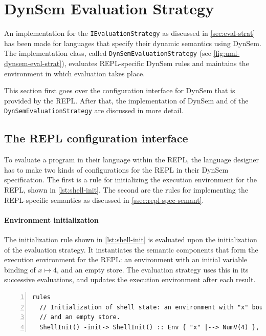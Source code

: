 \section{DynSem Evaluation Strategy}
\label{sec:dynsem-eval-strat}
An implementation for the \texttt{IEvaluationStrategy} as discussed in
\cref{sec:eval-strat} has been made for languages that specify their dynamic
semantics using DynSem. The implementation class, called
\texttt{DynSemEvaluationStrategy} (see \cref{fig:uml-dynsem-eval-strat}),
evaluates REPL-specific DynSem rules and maintains the environment in which
evaluation takes place.

This section first goes over the configuration interface for DynSem that is
provided by the REPL. After that, the implementation of DynSem and of the
\texttt{DynSemEvaluationStrategy} are discussed in more detail.

\subsection{The REPL configuration interface}
\label{sec:impl-repl-spec}
To evaluate a program in their language within the REPL, the language designer
has to make two kinds of configurations for the REPL in their DynSem
specification. The first is a rule for initializing the execution environment
for the REPL, shown in \cref{lst:shell-init}. The second are the rules for
implementing the REPL-specific semantics as discussed in
\cref{ssec:repl-spec-semant}.

\paragraph{Environment initialization} The initialization rule shown in
\cref{lst:shell-init} is evaluated upon the initialization of the evaluation
strategy. It instantiates the semantic components that form the execution
environment for the REPL: an environment with an initial variable binding of
$x \mapsto 4$, and an empty store. The evaluation strategy uses this in its
successive evaluations, and updates the execution environment after each result.

\begin{minipage}{\textwidth}
\begin{lstlisting}[language=dynsem,caption={The initialization rule for the
semantic components.},label={lst:shell-init},numbers=left]
rules
  // Initialization of shell state: an environment with "x" bound to 4,
  // and an empty store.
  ShellInit() -init-> ShellInit() :: Env { "x" |--> NumV(4) }, Store {}.
\end{lstlisting}
\end{minipage}

